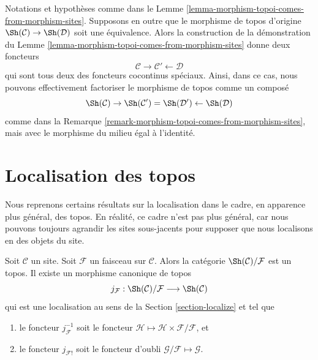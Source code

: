 \begin{remark}
\label{remark-equivalence-topoi-comes-from-morphism-sites}
Notations et hypothèses
comme dans le Lemme \ref{lemma-morphism-topoi-comes-from-morphism-sites}.
Supposons en outre que le morphisme de topos d’origine
$\Sh(\mathcal{C}) \to \Sh(\mathcal{D})$ soit une équivalence.
Alors la construction de la démonstration du
Lemme \ref{lemma-morphism-topoi-comes-from-morphism-sites}
donne deux foncteurs
$$
\mathcal{C} \rightarrow \mathcal{C}' \leftarrow \mathcal{D}
$$
qui sont tous deux des foncteurs cocontinus spéciaux.
Ainsi, dans ce cas, nous pouvons effectivement
factoriser le morphisme de topos comme un composé
$$
\Sh(\mathcal{C}) \rightarrow
\Sh(\mathcal{C}') =
\Sh(\mathcal{D}') \leftarrow
\Sh(\mathcal{D})
$$
comme dans la Remarque \ref{remark-morphism-topoi-comes-from-morphism-sites}, mais
avec le morphisme du milieu égal à l’identité.
\end{remark}








\section{Localisation des topos}
\label{section-localize-topoi}

\noindent
Nous reprenons certains résultats sur la localisation dans le cadre, en
apparence plus général, des topos. En réalité, ce cadre n’est pas plus général,
car nous pouvons toujours agrandir les sites sous-jacents pour supposer que
nous localisons en des objets du site.

\begin{lemma}
\label{lemma-localize-topos}
Soit $\mathcal{C}$ un site.
Soit $\mathcal{F}$ un faisceau sur $\mathcal{C}$.
Alors la catégorie $\Sh(\mathcal{C})/\mathcal{F}$ est un topos. Il existe un
morphisme canonique de topos
$$
j_\mathcal{F} :
\Sh(\mathcal{C})/\mathcal{F}
\longrightarrow
\Sh(\mathcal{C})
$$
qui est une localisation au sens de la Section \ref{section-localize} et tel
que
\begin{enumerate}
\item le foncteur $j_\mathcal{F}^{-1}$ soit le foncteur
$\mathcal{H} \mapsto \mathcal{H} \times \mathcal{F}/\mathcal{F}$, et
\item le foncteur $j_{\mathcal{F}!}$ soit le foncteur d’oubli
$\mathcal{G}/\mathcal{F} \mapsto \mathcal{G}$.
\end{enumerate}
\end{lemma}


